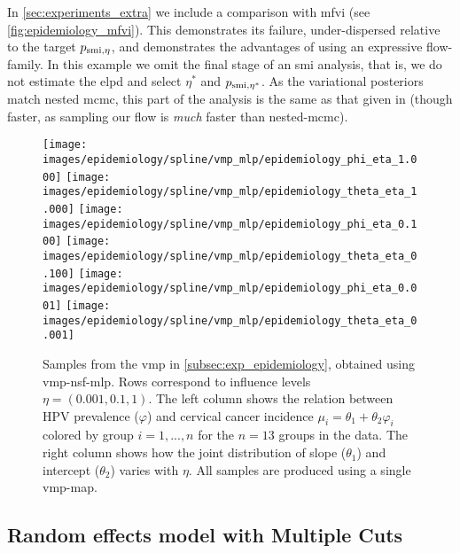 In \cref{sec:experiments_extra} we include a comparison with \acrshort*{mfvi} (see \cref{fig:epidemiology_mfvi}). This demonstrates its failure, under-dispersed relative to the target $p_{\operatorname{\text{smi}},\eta}$, and demonstrates the advantages of using an expressive flow-family.
In this example we omit the final stage of an \acrshort*{smi} analysis, that is, we do not estimate the \acrshort*{elpd} and select $\eta^*$ and $p_{\operatorname{\text{smi}},\eta^*}$. As the variational posteriors match nested \acrshort*{mcmc}, this part of the analysis is the same as that given in \cite{Carmona2020smi} (though faster, as sampling our flow is \emph{much} faster than nested-\acrshort*{mcmc}).

\begin{figure}[!htb]
  \centering
  \texttt{[image: images/epidemiology/spline/vmp\_mlp/epidemiology\_phi\_eta\_1.000]}
  \texttt{[image: images/epidemiology/spline/vmp\_mlp/epidemiology\_theta\_eta\_1.000]}
  \texttt{[image: images/epidemiology/spline/vmp\_mlp/epidemiology\_phi\_eta\_0.100]}
  \texttt{[image: images/epidemiology/spline/vmp\_mlp/epidemiology\_theta\_eta\_0.100]}
  \texttt{[image: images/epidemiology/spline/vmp\_mlp/epidemiology\_phi\_eta\_0.001]}
  \texttt{[image: images/epidemiology/spline/vmp\_mlp/epidemiology\_theta\_eta\_0.001]}

  \caption[Epidemiology model VMP]{
    Samples from the \acrlong*{vmp} in \cref{subsec:exp_epidemiology}, obtained using \acrshort*{vmp}-\acrshort*{nsf}-\acrshort*{mlp}.
    Rows correspond to influence levels $\eta=(0.001,0.1,1)$.
    The left column shows the relation between HPV prevalence ($\varphi$) and cervical cancer incidence $\mu_i=\theta_1+\theta_2\varphi_i$ colored by group $i=1,...,n$ for the $n=13$ groups in the data.
    The right column shows how the joint distribution of slope ($\theta_1$) and intercept ($\theta_2$) varies with $\eta$.
    All samples are produced using a single \acrshort*{vmp}-map.
  }
  \label{fig:epidemiology_vmp}
\end{figure}



\subsection{Random effects model with Multiple Cuts} \label{subsec:exp_rnd_eff}

